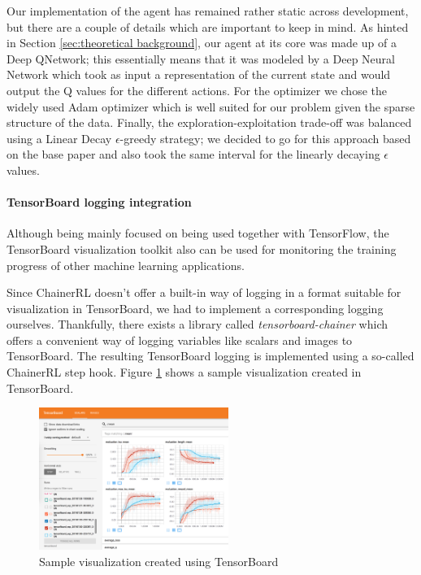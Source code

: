 Our implementation of the agent has remained rather static across development, but there are a couple of details which are important to keep in mind. As hinted in Section \ref{sec:theoretical background}, our agent at its core was made up of a Deep QNetwork; this essentially means that it was modeled by a Deep Neural Network which took as input a representation of the current state and would output the Q values for the different actions. For the optimizer we chose the widely used Adam optimizer which is well suited for our problem given the sparse structure of the data. Finally, the exploration-exploitation trade-off was balanced using a Linear Decay $\epsilon$-greedy strategy; we decided to go for this approach based on the base paper \cite{caicedo2015active} and also took the same interval for the linearly decaying $\epsilon$ values.

\paragraph{TensorBoard logging integration}

Although being mainly focused on being used together with TensorFlow, the TensorBoard visualization toolkit\cite{TensorBoard} also can be used for monitoring the training progress of other machine learning applications.

Since ChainerRL doesn't offer a built-in way of logging in a format suitable for visualization in TensorBoard, we had to implement a corresponding logging ourselves.
Thankfully, there exists a library called \textit{tensorboard-chainer}\cite{TensorBoardChainer} which offers a convenient way of logging variables like scalars and images to TensorBoard.
The resulting TensorBoard logging is implemented using a so-called ChainerRL step hook\cite{ChainerRLStepHooks}.
Figure \ref{fig:tensorboard-sample-output} shows a sample visualization created in TensorBoard.

\begin{figure}[h!]
    \centering
    \includegraphics[width=0.55\textwidth]{figures/tensorboard-sample-output.png}
    \caption{Sample visualization created using TensorBoard}
    \label{fig:tensorboard-sample-output}
\end{figure}

